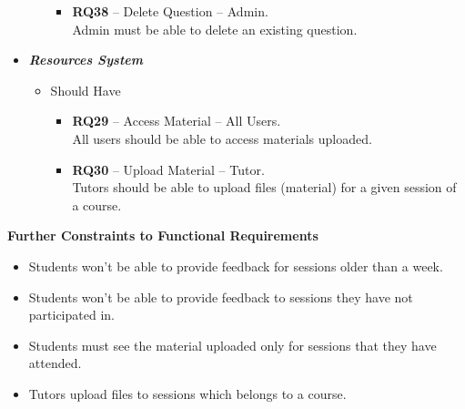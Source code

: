 \begin{justify}
\begin{itemize}
\begin{itemize}
\begin{itemize}
                        \item \textbf{\textcolor{vin}{RQ38}} -- Delete Question -- Admin.\\Admin must be able to delete an existing question.
                    \end{itemize}
            \end{itemize}
        \item \textbf{\textit{Resources System}}
            \begin{itemize}
                \item Should Have
                    \begin{itemize}
                        \item \textbf{\textcolor{vin}{RQ29}} -- Access Material -- All Users.\\All users should be able to access materials uploaded.

                        \item \textbf{\textcolor{vin}{RQ30}} -- Upload Material -- Tutor.\\Tutors should be able to upload files (material) for a given session of a course.\\
                    \end{itemize}
            \end{itemize}
    \end{itemize}

    \clearpage
    \newendline \textbf{Further Constraints to Functional Requirements}
    \begin{itemize}
        \item Students won’t be able to provide feedback for sessions older than a week.
        \item Students won’t be able to provide feedback to sessions they have not participated in.
        \item Students must see the material uploaded only for sessions that they have attended.
        \item Tutors upload files to sessions which belongs to a course.\newendline
    \end{itemize}


\end{justify}

